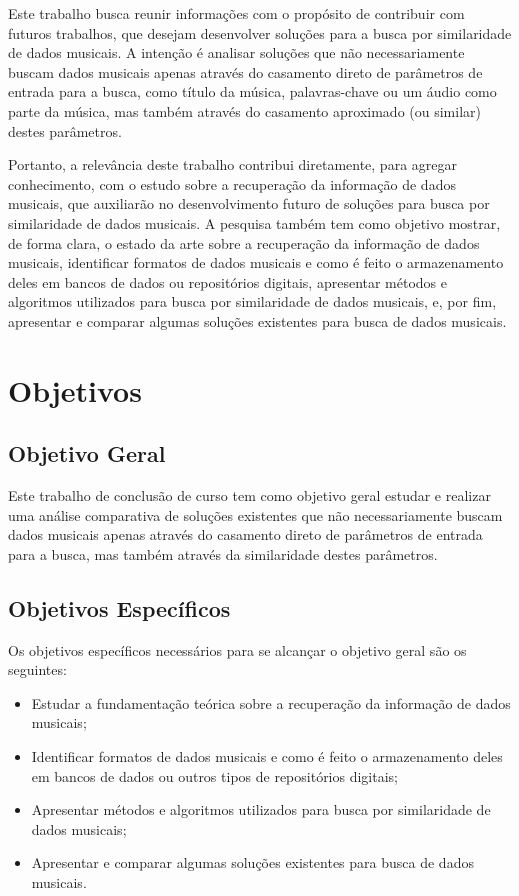 Este trabalho busca reunir informações com o propósito de contribuir com futuros trabalhos, que desejam desenvolver soluções para a busca por similaridade de dados musicais. A intenção é analisar soluções que não necessariamente buscam dados musicais apenas através do casamento direto de parâmetros de entrada para a busca, como título da música, palavras-chave ou um áudio como parte da música, mas também através do casamento aproximado (ou similar) destes parâmetros.

Portanto, a relevância deste trabalho contribui diretamente, para agregar conhecimento, com o estudo sobre a recuperação da informação de dados musicais, que auxiliarão no desenvolvimento futuro de soluções para busca por similaridade de dados musicais. A pesquisa também tem como objetivo mostrar, de forma clara, o estado da arte sobre a recuperação da informação de dados musicais, identificar formatos de dados musicais e como é feito o armazenamento deles em bancos de dados ou repositórios digitais, apresentar métodos e algoritmos utilizados para busca por similaridade de dados musicais, e, por fim, apresentar e comparar algumas soluções existentes para busca de dados musicais.

\section{Objetivos} \label{sec:objetivos}
\subsection{Objetivo Geral} \label{subsec:objetivo-geral}
Este trabalho de conclusão de curso tem como objetivo geral estudar e realizar uma análise comparativa de soluções existentes que não necessariamente buscam dados musicais apenas através do casamento direto de parâmetros de entrada para a busca, mas também através da similaridade destes parâmetros.

\subsection{Objetivos Específicos} \label{subsec:objetivos-especificos}
Os objetivos específicos necessários para se alcançar o objetivo geral são os seguintes:

 \begin{itemize}
   \item Estudar a fundamentação teórica sobre a recuperação da informação de dados musicais;
   \item Identificar formatos de dados musicais e como é feito o armazenamento deles em bancos de dados ou outros tipos de repositórios digitais;
   \item Apresentar métodos e algoritmos utilizados para busca por similaridade de dados musicais;
   \item Apresentar e comparar algumas soluções existentes para busca de dados musicais.
 \end{itemize}
 
